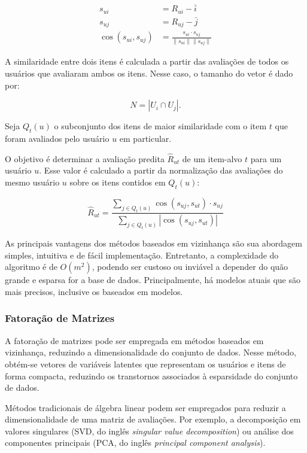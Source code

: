\begin{align}
    s_{ui} &= R_{ui} - \bar{i} \\
    s_{uj} &= R_{uj} - \bar{j} \\
    \cos(s_{ui},s_{uj}) &= \frac{s_{ui} \cdot s_{uj}}{\|s_{ui}\| \|s_{uj}\|}
\end{align}

A similaridade entre dois itens é calculada a partir das avaliações de todos os
usuários que avaliaram ambos os itens. Nesse caso, o tamanho do vetor é dado por:

\begin{equation}
    N = |U_i \cap U_j|.
\end{equation}

Seja $Q_t (u)$ o subconjunto dos itens de maior similaridade com o item $t$ que
foram avaliados pelo usuário $u$ em particular.

O objetivo é determinar a avaliação predita $\hat{R}_{ut}$ de um item-alvo $t$ para um usuário
$u$. Esse valor é calculado a partir da normalização das avaliações do mesmo
usuário $u$ sobre os itens contidos em $Q_t (u)$:

\begin{equation}
    \hat{R}_{ut} = \frac{\sum_{j \in Q_t(u)} \cos(s_{uj},s_{ut}) \cdot s_{uj}}{\sum_{j \in Q_t(u)} |\cos(s_{uj},s_{ut})|}
\end{equation}

As principais vantagens dos métodos baseados em vizinhança são sua abordagem
simples, intuitiva e de fácil implementação. Entretanto, a complexidade do
algoritmo é de $O(m^2)$, podendo ser custoso ou inviável a depender do quão
grande e esparsa for a base de dados. Principalmente, há modelos atuais que são
mais precisos, inclusive os baseados em modelos.

\subsubsection{Fatoração de Matrizes}
A fatoração de matrizes pode ser empregada em métodos baseados em vizinhança,
reduzindo a dimensionalidade do conjunto de dados. Nesse método, obtém-se
vetores de variáveis latentes que representam os usuários e itens de forma
compacta, reduzindo os transtornos associados à esparsidade do conjunto de
dados.

Métodos tradicionais de álgebra linear podem ser empregados para reduzir a
dimensionalidade de uma matriz de avaliações. Por exemplo, a decomposição em
valores singulares (SVD, do inglês \textit{singular value decomposition}) ou
análise dos componentes principais (PCA, do inglês \textit{principal component
analysis}).

